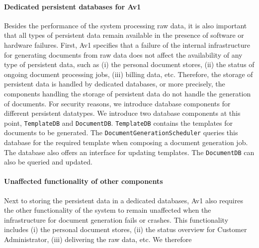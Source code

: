 \documentclass[a4paper,10pt]{article}
\begin{document}
\paragraph{Dedicated persistent databases for Av1}
Besides the performance of the system processing raw data, it is also important that all types of persistent data remain available in the presence of software or hardware failures.
First, Av1 specifies that a failure of the internal infrastructure for generating documents from raw data does not affect the availability of any type of persistent data, such as (i) the personal document stores, (ii) the status of ongoing document processing jobs, (iii) billing data, etc. Therefore, the storage of persistent data is handled by dedicated databases, or more precisely, the components handling the storage of persistent data do not handle the generation of documents. For security reasons, we introduce database components for different persistent datatypes. We introduce two database components at this point, \texttt{TemplateDB} and \texttt{DocumentDB}. \texttt{TemplateDB} contains the templates for documents to be generated. The \texttt{DocumentGenerationScheduler} queries this database for the required template when composing a document generation job.  The database also offers an interface for updating templates. The \texttt{DocumentDB} can also be queried and updated.

\paragraph{Unaffected functionality of other components}
Next to storing the  persistent data in a dedicated databases, Av1 also requires the other functionality of the system to remain unaffected when the infrastructure for document generation fails or crashes. This functionality includes (i) the personal document stores, (ii) the status overview for Customer Administrator, (iii) delivering the raw data, etc.
We therefore 
\end{document}
